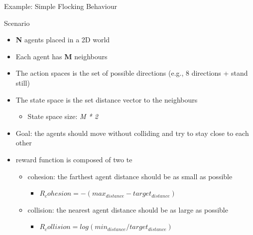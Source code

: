 \documentclass[presentation, 8pt]{beamer}\mode<presentation>{\usetheme{AMSBolognaFC}}
\begin{document}
\begin{frame}{Example: Simple Flocking Behaviour}
	\begin{exampleblock}{Scenario}
		\begin{itemize}
			\item \textbf{N} agents placed in a 2D world
			\item Each agent has \textbf{M} neighbours
			\item The action spaces is the set of possible directions (e.g., 8 directions + stand still)
			\item The state space is the set distance vector to the neighbours
			\begin{itemize}
				\item State space size: \emph{M * 2}
			\end{itemize}
			\item Goal: the agents should move without colliding and try to stay close to each other
			\item reward function is composed of two te
			\begin{itemize}
				\item cohesion: the farthest agent distance should be as small as possible
					\begin{itemize}
						\item $R_cohesion = -(max_{distance} - target_{distance})$
					\end{itemize}
				\item collision: the nearest agent distance should be as large as possible
				\begin{itemize}
					\item $R_collision = log(min_{distance} / target_{distance})$
				\end{itemize}
			\end{itemize}
		\end{itemize}
	\end{exampleblock}
\end{frame}
\end{document}
